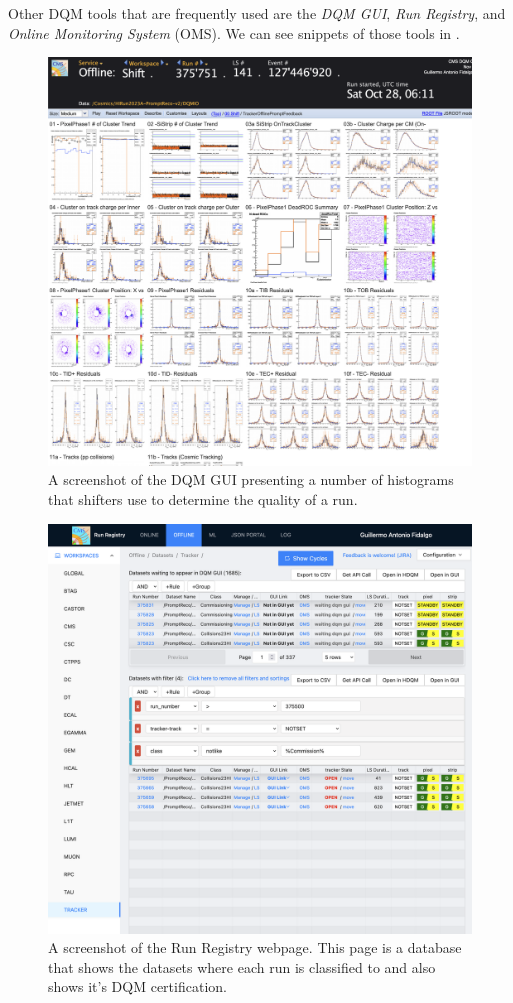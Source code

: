 Other DQM tools that are frequently used are the \textit{DQM GUI}, \textit{Run Registry}, and \textit{Online Monitoring System} (OMS). We can see snippets of those tools in .


\begin{figure}
	\includegraphics*[width=\linewidth,trim= 0 7in 1in 0 ]{Images/DQM GUI.png}
	\caption{A screenshot of the DQM GUI presenting a number of histograms that shifters use to determine the quality of a run.}
	\label{fig:dqmgui}
\end{figure}

\begin{figure}
	\includegraphics*[width=\linewidth,trim= 2.9in 4.4in 0 0in]{Images/RR.png}
	\caption{A screenshot of the Run Registry webpage. This page is a database that shows the datasets where each run is classified to and also shows it's DQM certification.}
	\label{fig:RR}
\end{figure}



